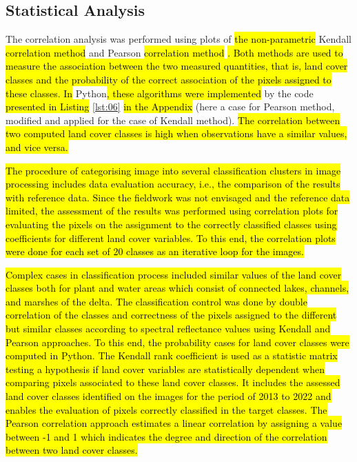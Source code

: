 \documentclass[12pt,a4paper,oneside]{article}
\def \newpar{\vspace{6pt}}
\begin{document}
\subsection*{Statistical Analysis}

\newpar The correlation analysis was performed using plots of \hl{the non-parametric }Kendall \hl{correlation method} \citep{Kendall1938} and Pearson \hl{correlation method} \citep{Pearson1895}\hl{. Both methods are used to measure the association between the two measured quantities, that is, land cover classes and the probability of the correct association of the pixels assigned to these classes. In} Python\hl{, these algorithms were implemented }by the code \hl{presented in Listing} \ref{lst:06} \hl{in the Appendix} (here a case for Pearson method, modified and applied for the case of Kendall method). \hl{The correlation between two computed land cover classes is high when observations have a similar values, and vice versa.}

\newpar \hl{The procedure of categorising image into several classification clusters in image processing includes data evaluation accuracy, i.e., the comparison of the results with reference data. Since the fieldwork was not envisaged and the reference data limited, the assessment of the results was performed using correlation plots for evaluating the pixels on the assignment to the correctly classified classes using coefficients for different land cover variables. To this end, the correlation plots were done for each set of 20 classes as an iterative loop for the images.}

\newpar \hl{Complex cases in classification process included similar values of the land cover classes both for plant and water areas which consist of connected lakes, channels, and marshes of the delta. The classification control was done by double correlation of the classes and correctness of the pixels assigned to the different but similar classes according to spectral reflectance values using Kendall and Pearson approaches. To this end, the probability cases for land cover classes were computed in Python. The Kendall rank coefficient is used as a statistic matrix testing a hypothesis if land cover variables are statistically dependent when comparing pixels associated to these land cover classes. It includes the assessed land cover classes identified on the images for the period of 2013 to 2022 and enables the evaluation of pixels correctly classified in the target classes. The Pearson correlation approach estimates a linear correlation by assigning a value between -1 and 1 which indicates the degree and direction of the correlation between two land cover classes.}
\end{document}
